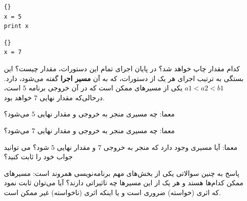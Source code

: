 \documentclass{book}
\begin{document}
\begin{latin}
\begin{minipage}[t]{2in}
\begin{latin}
\begin{lstlisting}[title=\rl{نخ \lr{A}}]{}
x = 5
print x
\end{lstlisting}
\end{latin}
\end{minipage}
\hfill
\begin{minipage}[t]{2in}
\begin{latin}
\begin{lstlisting}[title=\rl{نخ \lr{B}}]{}
x = 7
\end{lstlisting}
\end{latin}
\end{minipage}
\end{latin}


کدام مقدار  چاپ خواهد شد؟ در پایان اجرای تمام این دستورات، مقدار  چیست؟ 
این بستگی به ترتیب اجرای هر یک از دستورات، که به آن \textbf{مسیر اجرا} گفته می‌شود، دارد. 
$a1 < a2 < b1$ یکی از مسیرهای ممکن است که در آن خروجی برنامه 
\texttt{$5$} است، درحالی‌که مقدار نهایی \texttt{$7$} خواهد بود. 


معما: چه مسیری منجر به خروجی و مقدار نهایی \texttt{$5$} می‌شود؟


معما: چه مسیری منجر به خروجی و مقدار نهایی \texttt{$7$} می‌شود؟

معما: آیا مسیری وجود دارد که منجر به خروجی \texttt{$7$} و مقدار نهایی \texttt{$5$} شود؟ می توانید جواب خود را ثابت کنید؟

پاسخ به چنین سوالاتی یکی از بخش‌های مهم برنامه‌نویسی همروند است: مسیرهای ممکن کدام‌ها هستد و هر یک از این مسیرها چه تاثیراتی دارند؟ 
    آیا می‌توان ثابت نمود که اثری (خواسته) ضروری است و یا اینکه اثری (ناخواسته) غیر ممکن است. 
\end{document}
